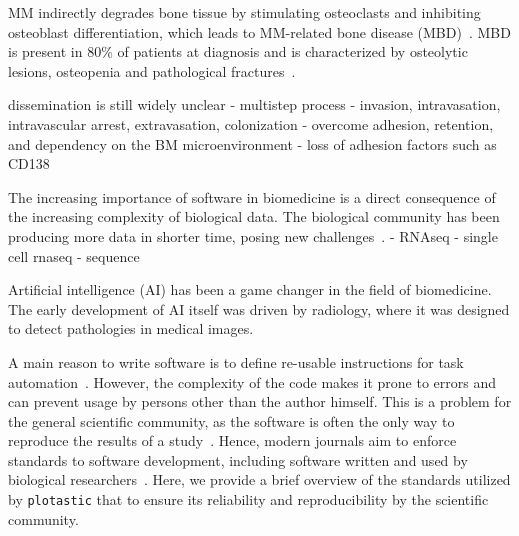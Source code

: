 MM indirectly degrades bone tissue by stimulating osteoclasts and inhibiting
osteoblast differentiation, which leads to MM-related bone disease
(MBD)~\cite{glaveyProteomicCharacterizationHuman2017}. MBD is present in 80\% of
patients at diagnosis and is characterized by osteolytic lesions, osteopenia and
pathological fractures~\cite{terposPathogenesisBoneDisease2018}.


dissemination is still widely unclear
- multistep process
- invasion, intravasation, intravascular arrest, extravasation,
colonization
- overcome adhesion, retention, and dependency on the BM
microenvironment
- loss of adhesion factors such as CD138

\newpage



The increasing importance of software in biomedicine is a direct consequence of
the increasing complexity of biological data. The biological community has been
producing more data in shorter time, posing new
challenges~\cite{yangScalabilityValidationBig2017}. - RNAseq - single cell
rnaseq - sequence

Artificial intelligence (AI) has been a game changer in the field of
biomedicine. The early development of AI itself was driven by radiology,
where it was designed to detect pathologies in medical images.


A main reason to write software is to define re-usable instructions for task
automation~\cite{narztReusabilityConceptProcess1998}. However, the complexity of
the code makes it prone to errors and can prevent usage by persons other than
the author himself. This is a problem for the general scientific community, as
the software is often the only way to reproduce the results of a
study~\cite{sandveTenSimpleRules2013}. Hence, modern journals aim to enforce
standards to software development, including software written and used by
biological researchers~\cite{smithJournalOpenSource2018}. Here, we provide a
brief overview of the standards utilized by \texttt{plotastic} that to ensure
its reliability and reproducibility by the scientific community.

